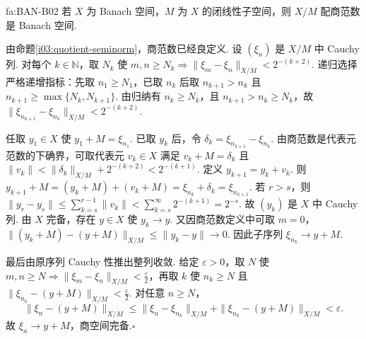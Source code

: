 \begin{FATheorem}[B][商Banach空间完备性]{fa:BAN-B02}
若 \(\displaystyle X\) 为 Banach 空间，\(\displaystyle M\) 为 \(\displaystyle X\) 的闭线性子空间，则 \(\displaystyle X/M\) 配商范数是 Banach 空间.
\end{FATheorem}

\begin{FAProof}
由命题\ref{i03:quotient-seminorm}，商范数已经良定义. 设 \(\displaystyle (\xi_n)\) 是 \(\displaystyle X/M\) 中 Cauchy 列. 对每个 \(\displaystyle k\in\mathbb N\)，取 \(\displaystyle N_k\) 使 \(\displaystyle m,n\geqslant N_k\Longrightarrow \|\xi_m-\xi_n\|_{X/M}<2^{-(k+2)}\).
递归选择严格递增指标：先取 \(\displaystyle n_1\geqslant N_1\)，已取 \(\displaystyle n_k\) 后取 \(\displaystyle n_{k+1}>n_k\) 且 \(\displaystyle n_{k+1}\geqslant\max\{N_k,N_{k+1}\}\). 由归纳有 \(\displaystyle n_k\geqslant N_k\)，且 \(\displaystyle n_{k+1}>n_k\geqslant N_k\)，故 \(\displaystyle \|\xi_{n_{k+1}}-\xi_{n_k}\|_{X/M}<2^{-(k+2)}\).

任取 \(\displaystyle y_1\in X\) 使 \(\displaystyle y_1+M=\xi_{n_1}\). 已取 \(\displaystyle y_k\) 后，令 \(\displaystyle \delta_k=\xi_{n_{k+1}}-\xi_{n_k}\). 由商范数是代表元范数的下确界，可取代表元 \(\displaystyle v_k\in X\) 满足 \(\displaystyle v_k+M=\delta_k\) 且
\(\displaystyle \|v_k\|<\|\delta_k\|_{X/M}+2^{-(k+2)}<2^{-(k+1)}\).
定义 \(\displaystyle y_{k+1}=y_k+v_k\). 则 \(\displaystyle y_{k+1}+M =(y_k+M)+(v_k+M) =\xi_{n_k}+\delta_k =\xi_{n_{k+1}}\).
若 \(\displaystyle r>s\)，则 \(\displaystyle \|y_r-y_s\| \leqslant\sum_{k=s}^{r-1}\|v_k\| <\sum_{k=s}^{\infty}2^{-(k+1)} =2^{-s}\).
故 \(\displaystyle (y_k)\) 是 \(\displaystyle X\) 中 Cauchy 列. 由 \(\displaystyle X\) 完备，存在 \(\displaystyle y\in X\) 使 \(\displaystyle y_k\to y\). 又因商范数定义中可取 \(\displaystyle m=0\)， \(\displaystyle \|(y_k+M)-(y+M)\|_{X/M} \leqslant\|y_k-y\|\longrightarrow0\).
因此子序列 \(\displaystyle \xi_{n_k}\to y+M\).

最后由原序列 Cauchy 性推出整列收敛. 给定 \(\displaystyle \varepsilon>0\)，取 \(\displaystyle N\) 使 \(\displaystyle m,n\geqslant N\Rightarrow\|\xi_m-\xi_n\|_{X/M}<\frac{\varepsilon}{2}\)，再取 \(\displaystyle k\) 使 \(\displaystyle n_k\geqslant N\) 且 \(\displaystyle \|\xi_{n_k}-(y+M)\|_{X/M}<\frac{\varepsilon}{2}\). 对任意 \(\displaystyle n\geqslant N\)，
\[
\|\xi_n-(y+M)\|_{X/M}
\leqslant\|\xi_n-\xi_{n_k}\|_{X/M}+\|\xi_{n_k}-(y+M)\|_{X/M}<\varepsilon.
\]
故 \(\displaystyle \xi_n\to y+M\)，商空间完备.\hfill\(\square\)
\end{FAProof}

